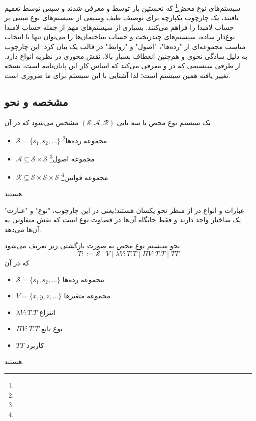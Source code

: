 سیستم‌های نوع محض\footnote{}
که نخستین بار توسط
\cite{berardi1988} و \cite{terlouw1989}
معرفی شدند و سپس توسط
\cite{barendregt1991}
تعمیم یافتند، یک چارچوب یکپارچه برای توصیف طیف وسیعی از سیستم‌های نوع مبتنی بر حساب لامبدا را فراهم می‌کنند.
بسیاری از سیستم‌های مهم از جمله حساب لامبدا نوع‌دار ساده، سیستم‌های چندریخت و حساب ساختمان‌ها را می‌توان تنها با انتخاب مناسب مجموعه‌ای از "رده‌ها"، "اصول" و "روابط" در قالب یک
بیان کرد. این چارچوب به دلیل سادگی نحوی و هم‌چنین انعطاف بسیار بالا، نقش محوری در نظریه انواع دارد. از طرفی سیستمی که
در \cite{types2022} و \cite{mull2023}
معرفی می‌کند که اساس کار این پایان‌نامه است، نسخه‌ تغییر یافته همین سیستم است؛
لذا آشنایی با این سیستم برای ما ضروری است.

\subsection*{مشخصه و نحو}

\begin{defn}
یک سیستم نوع محض با سه تایی
$(\mathcal{S},\mathcal{A},\mathcal{R})$
مشخص می‌شود که در آن
\begin{itemize}
\item $\mathcal{S}=\{s_1,s_2,\dots\}$ مجموعه رده‌ها\footnote{}
\item $\mathcal{A \subseteq S \times S}$ مجموعه اصول\footnote{}
\item $\mathcal{R \subseteq S \times S \times S}$ مجموعه قوانین\footnote{}
\end{itemize}
هستند.
\end{defn}

عبارات و انواع در
از منظر نحو یکسان هستند؛یعنی در این چارچوب، "نوع" و "عبارت" یک ساختار واحد دارند و فقط جایگاه آن‌ها در قضاوت نوع است که نقش متفاوتی به آن‌ها می‌دهد.

\begin{defn}
نحو سیستم نوع محض به صورت بازگشتی زیر تعریف می‌شود
\begin{equation*}
T ::= \mathcal{S} \mid V \mid \lambda V:T.T \mid \Pi V:T.T \mid TT
\end{equation*}
که در آن
\begin{itemize}
\item $\mathcal{S}=\{s_1,s_2,\dots\}$ مجموعه رده‌ها
\item $V=\{x,y,z,\dots\}$ مجموعه متغیرها
\item $\lambda V:T.T$ انتزاع
\item $\Pi V:T.T$ نوع تابع
\item $TT$ کاربرد
\end{itemize}
هستند.
\end{defn}

